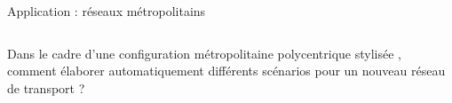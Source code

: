 \documentclass{beamer}
\begin{document}
\begin{frame}{}
\begin{columns}[t]
\begin{column}{.49\textwidth}
      
      
        \begin{block}{Application : réseaux métropolitains}
          \begin{columns}[t]
        \begin{column}{.95\textwidth}
        \begin{justify}
        \vspace{-2cm}
          
          
          
          Dans le cadre d'une configuration métropolitaine polycentrique stylisée \cite{le2015modeling}, comment élaborer automatiquement différents scénarios pour un nouveau réseau de transport ?
          
          \bigskip\bigskip
          

\end{justify}
\end{column}
\end{columns}
\end{block}
\end{column}
\end{columns}
\end{frame}
\end{document}
